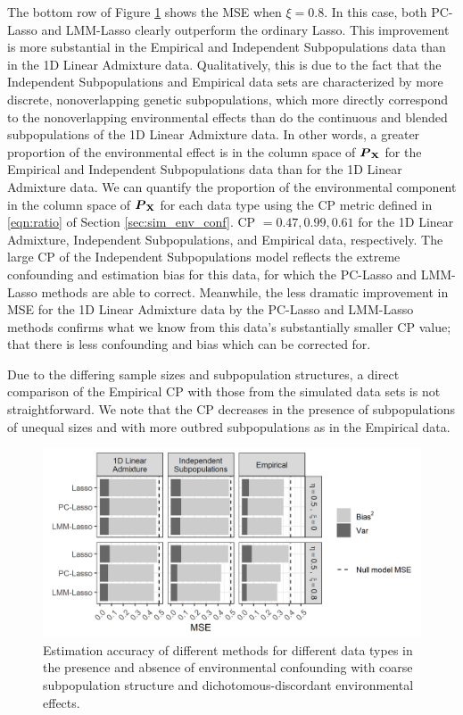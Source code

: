 The bottom row of Figure \ref{fig:mse} shows the MSE when $\xi = 0.8$. In this case, both PC-Lasso and LMM-Lasso clearly outperform the ordinary Lasso. This improvement is more substantial in the Empirical and Independent Subpopulations data than in the 1D Linear Admixture data. Qualitatively, this is due to the fact that the Independent Subpopulations and Empirical data sets are characterized by more discrete, nonoverlapping genetic subpopulations, which more directly correspond to the nonoverlapping environmental effects than do the continuous and blended subpopulations of the 1D Linear Admixture data. In other words, a greater proportion of the environmental effect is in the column space of $\boldsymbol{P}_{\textbf{X}}$ for the Empirical and Independent Subpopulations data than for the 1D Linear Admixture data. We can quantify the proportion of the environmental component in the column space of $\boldsymbol{P}_{\textbf{X}}$ for each data type using the CP metric defined in \eqref{eqn:ratio} of Section \ref{sec:sim_env_conf}. CP $= 0.47, 0.99, 0.61$ for the 1D Linear Admixture, Independent Subpopulations, and Empirical data, respectively. The large CP of the Independent Subpopulations model reflects the extreme confounding and estimation bias for this data, for which the PC-Lasso and LMM-Lasso methods are able to correct. Meanwhile, the less dramatic improvement in MSE for the 1D Linear Admixture data by the PC-Lasso and LMM-Lasso methods confirms what we know from this data's substantially smaller CP value; that there is less confounding and bias which can be corrected for. 

Due to the differing sample sizes and subpopulation structures, a direct comparison of the Empirical CP with those from the simulated data sets is not straightforward. We note that the CP decreases in the presence of subpopulations of unequal sizes and with more outbred subpopulations as in the Empirical data. 


\begin{figure}[H]
    \centering
    \includegraphics[scale = 1.1]{figures/beta_mse.png}
    \caption{Estimation accuracy of different methods for different data types in the presence and absence of environmental confounding with coarse subpopulation structure and dichotomous-discordant environmental effects.}
    \label{fig:mse}
\end{figure}


